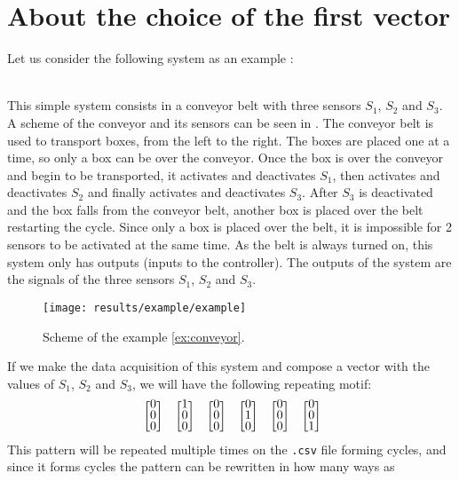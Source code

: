 \section{About the choice of the first vector}
Let us consider the following system as an example : 
\begin{example}~\\
  \label{ex:conveyor}
 This simple system consists in a conveyor belt with three sensors $S_1$, $S_2$ and
 $S_3$. A scheme of the conveyor and its sensors can be seen in
 . The conveyor belt is used to transport boxes, from
 the left to the right. The boxes are placed one at a time, so only a box can be
 over the conveyor. Once the box is over
 the conveyor and begin to be transported, it activates and deactivates $S_1$,
 then activates and deactivates $S_2$ and
 finally activates and deactivates $S_3$. After $S_3$ is deactivated and the box
 falls from the conveyor belt, another
 box is placed over the
 belt restarting the cycle. Since only a box is placed over the belt,
 it is impossible for 2 sensors to be activated at the same time.  As the belt is always turned on, this system
 only has outputs (inputs to the controller). The outputs of the system are the signals of the three sensors $S_1$, $S_2$ and
 $S_3$.
\end{example}
\begin{figure}[H]
  \centering
  \texttt{[image: results/example/example]}
  \caption{Scheme of the example \ref{ex:conveyor}.}
    \label{fig:schemeExConveyor}
\end{figure}
If we make the data acquisition of this system and compose a vector with the
values of $S_1$, $S_2$ and $S_3$, we will have the following repeating motif:
\begin{align}
  \label{motif}
\colvec{0\\0\\0}\colvec{1\\0\\0}\colvec{0\\0\\0}\colvec{0\\1\\0}\colvec{0\\0\\0}\colvec{0\\0\\1}
\end{align}
This pattern will be repeated multiple times on the \verb|.csv| file forming
cycles, and since it forms cycles the pattern can be rewritten in how many ways as
